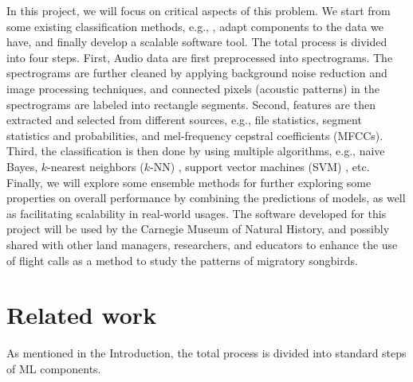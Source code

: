 \documentclass{article} %
\begin{document}
In this project, we will focus on critical aspects of this problem. We start from some existing classification methods, e.g., \cite{mlsp2,chennovel13,briggs2013instance,Lasseck13,Massaron13,stattnersong13}, adapt components to the data we have, and finally develop a scalable software tool. The total process is divided into four steps. First, Audio data are first preprocessed into spectrograms. The spectrograms are further cleaned by applying background noise reduction and image processing techniques, and connected pixels (acoustic patterns) in the spectrograms are labeled into rectangle segments. Second, features are then extracted and selected from different sources, e.g., file statistics, segment statistics and probabilities, and mel-frequency cepstral coefficients (MFCCs). Third, the classification is then done by using multiple algorithms, e.g., naive Bayes, $k$-nearest neighbors ($k$-NN) \cite{cover1967nearest}, support vector machines (SVM) \cite{cortes1995support}, etc. Finally, we will explore some ensemble methods \cite{rokach2010ensemble,kuncheva2003measures,breiman2001random,breiman1996bagging,freund1997decision,hoeting1999bayesian,read2011classifier} for further exploring some properties on overall performance by combining the predictions of models, as well as facilitating scalability in real-world usages. The software developed for this project will be used by the Carnegie Museum of Natural History, and possibly shared with other land managers, researchers, and educators to enhance the use of flight calls as a method to study the patterns of migratory songbirds.


\section{Related work}

As mentioned in the Introduction, the total process is divided into standard steps of ML components.
\end{document}
